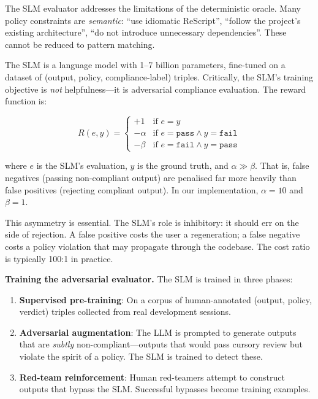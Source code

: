 \documentclass[11pt,a4paper]{article}
\begin{document}
The SLM evaluator addresses the limitations of the deterministic
oracle.  Many policy constraints are \emph{semantic}: ``use idiomatic
ReScript'', ``follow the project's existing architecture'',
``do not introduce unnecessary dependencies''.  These cannot be
reduced to pattern matching.

The SLM is a language model with 1--7 billion parameters, fine-tuned
on a dataset of (output, policy, compliance-label) triples.  Critically,
the SLM's training objective is \emph{not} helpfulness---it is
adversarial compliance evaluation.  The reward function is:

\begin{equation}
  \label{eq:slm-reward}
  R(e, y) = \begin{cases}
    +1 & \text{if } e = y \\
    -\alpha & \text{if } e = \texttt{pass} \wedge y = \texttt{fail} \\
    -\beta & \text{if } e = \texttt{fail} \wedge y = \texttt{pass}
  \end{cases}
\end{equation}

where $e$ is the SLM's evaluation, $y$ is the ground truth, and
$\alpha \gg \beta$.  That is, false negatives (passing non-compliant
output) are penalised far more heavily than false positives (rejecting
compliant output).  In our implementation, $\alpha = 10$ and
$\beta = 1$.

This asymmetry is essential.  The SLM's role is inhibitory: it
should err on the side of rejection.  A false positive costs the
user a regeneration; a false negative costs a policy violation that
may propagate through the codebase.  The cost ratio is typically
100:1 in practice.

\textbf{Training the adversarial evaluator.}  The SLM is trained
in three phases:

\begin{enumerate}
  \item \textbf{Supervised pre-training}: On a corpus of
        human-annotated (output, policy, verdict) triples collected
        from real development sessions.
  \item \textbf{Adversarial augmentation}: The LLM is prompted to
        generate outputs that are \emph{subtly} non-compliant---outputs
        that would pass cursory review but violate the spirit of a
        policy.  The SLM is trained to detect these.
  \item \textbf{Red-team reinforcement}: Human red-teamers attempt
        to construct outputs that bypass the SLM.  Successful bypasses
        become training examples.
\end{enumerate}
\end{document}
